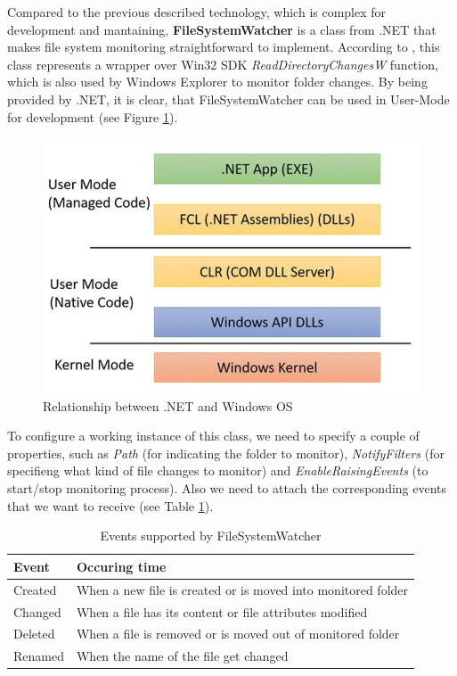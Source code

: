 Compared to the previous described technology, which is complex for development and mantaining, \textbf{FileSystemWatcher} is a class from .NET that makes file system monitoring straightforward to implement. According to \cite{dotNetFramework}, this class represents a wrapper over Win32 SDK \textit{ReadDirectoryChangesW} function, which is also used by Windows Explorer to monitor folder changes. By being provided by .NET, it is clear, that FileSystemWatcher can be used in User-Mode for development (see Figure \ref{netFramework}). 

\begin{figure}[H]
	\centerline{\includegraphics[scale=0.5]{figures/NetFramework.png}}  
	\caption{Relationship between .NET and Windows OS \cite{winInternals}}
	\label{netFramework}
\end{figure}

To configure a working instance of this class, we need to specify a couple of properties, such as \textit{Path} (for indicating the folder to monitor), \textit{NotifyFilters} (for specifieng what kind of file changes to monitor) and \textit{EnableRaisingEvents} (to start/stop monitoring process). Also we need to attach the corresponding events that we want to receive (see Table \ref{table:supportedEvents}).

\begin{table}[H]
	\caption{Events supported by FileSystemWatcher}
	\label{table:supportedEvents}
		\centering
            \begin{tabular}{l | l}
                
				\textbf{Event} & \textbf{Occuring time} \\
				\hline 
 				Created & When a new file is created or is moved into monitored folder \\
 				Changed & When a file has its content or file attributes modified \\
 				Deleted & When a file is removed or is moved out of monitored folder \\
                Renamed & When the name of the file get changed \\
                 
			\end{tabular}
\end{table}


